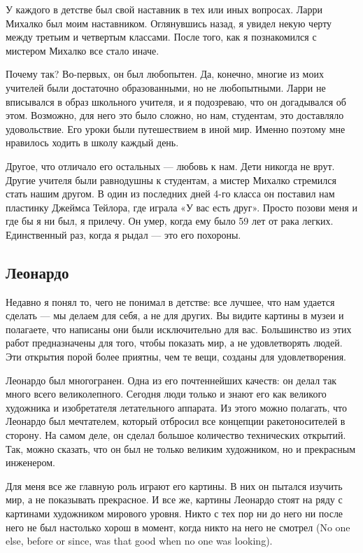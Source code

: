 \documentclass[ebook,12pt,oneside,openany]{memoir}
\begin{document}
У каждого в детстве был свой наставник в тех или иных вопросах. Ларри
Михалко был моим наставником. Оглянувшись назад, я увидел некую черту
между третьим и четвертым классами. После того, как я познакомился с
мистером Михалко все стало иначе. \newline

Почему так? Во-первых, он был любопытен. Да, конечно, многие из моих
учителей были достаточно образованными, но не любопытными. Ларри не
вписывался в образ школьного учителя, и я подозреваю, что он
догадывался об этом. Возможно, для него это было сложно, но нам,
студентам, это доставляло удовольствие. Его уроки были путешествием в
иной мир. Именно поэтому мне нравилось ходить в школу каждый день. \newline

Другое, что отличало его остальных — любовь к нам. Дети никогда не
врут. Другие учителя были равнодушны к студентам, а мистер Михалко
стремился стать нашим другом. В один из последних дней 4-го класса он
поставил нам пластинку Джеймса Тейлора, где играла «У вас есть друг».
Просто позови меня и где бы я ни был, я прилечу. Он умер, когда ему
было 59 лет от рака легких. Единственный раз, когда я рыдал — это его
похороны. \newline

\subsection{Леонардо}

Недавно я понял то, чего не понимал в детстве: все лучшее, что нам
удается сделать — мы делаем для себя, а не для других. Вы видите
картины в музеи и полагаете, что написаны они были исключительно для
вас. Большинство из этих работ предназначены для того, чтобы показать
мир, а не удовлетворять людей. Эти открытия порой более приятны, чем
те вещи, созданы для удовлетворения. \newline

Леонардо был многогранен. Одна из его почтеннейших качеств: он делал
так много всего великолепного. Сегодня люди только и знают его как
великого художника и изобретателя летательного аппарата. Из этого
можно полагать, что Леонардо был мечтателем, который отбросил все
концепции ракетоносителей в сторону. На самом деле, он сделал большое
количество технических открытий. Так, можно сказать, что он был не
только великим художником, но и прекрасным инженером. \newline

Для меня все же главную роль играют его картины. В них он пытался
изучить мир, а не показывать прекрасное. И все же, картины Леонардо
стоят на ряду с картинами художником мирового уровня. Никто с тех пор
ни до него ни после него не был настолько хорош в момент, когда никто
на него не смотрел (No one else, before or since, was that good when
no one was looking). \newline
\end{document}

